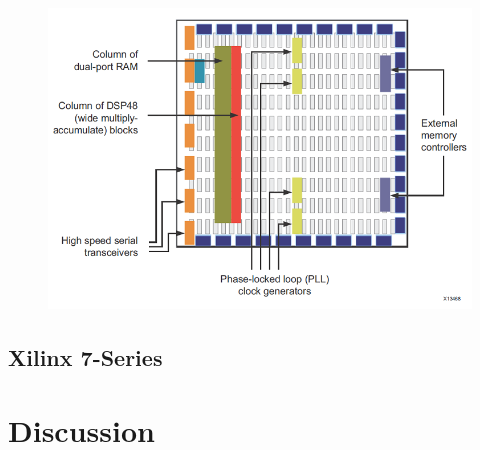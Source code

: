 \documentclass[12pt]{report}
\begin{document}
\begin{figure}[h]
    \centering
    \includegraphics[scale=0.5]{figures/contemporary_fpga.png}
    \caption{ \citep{XilFPGAArch}}
    \label{fig:5}
\end{figure}

\section{Xilinx 7-Series}

\chapter{Discussion}




\end{document}

